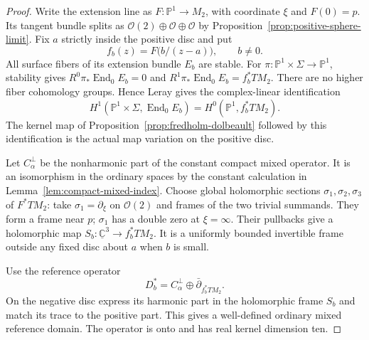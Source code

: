 \documentclass[11pt]{amsart}
\theoremstyle{definition}
\theoremstyle{remark}
\theoremstyle{plain}
\begin{document}
\begin{proof}
Write the extension line as $F:\mathbb P^1\to M_2$,
with coordinate $\xi$ and $F(0)=p$. Its tangent bundle
splits as $\mathcal O(2)\oplus\mathcal O\oplus\mathcal O$
by Proposition~\ref{prop:positive-sphere-limit}.
Fix $a$ strictly inside the positive disc and put
\[
                     f_b(z)=F\bigl(b/(z-a)\bigr),\qquad b\ne0.
\]
All surface fibers of its extension bundle $E_b$ are stable.
For $\pi:\mathbb P^1\times\Sigma\to\mathbb P^1$, stability
gives $R^0\pi_*\operatorname{End}_0E_b=0$ and
$R^1\pi_*\operatorname{End}_0E_b=f_b^*TM_2$.
There are no higher fiber cohomology groups. Hence Leray gives
the complex-linear identification
\begin{equation}\label{eq:fully-stable-leray-orientation}
 H^1(\mathbb P^1\times\Sigma,\operatorname{End}_0E_b)
                         =H^0(\mathbb P^1,f_b^*TM_2).
\end{equation}
The kernel map of Proposition~\ref{prop:fredholm-dolbeault}
followed by this identification is the actual map
variation on the positive disc.

Let $C_\alpha^\perp$ be the nonharmonic part of the
constant compact mixed operator. It is an isomorphism
in the ordinary spaces by the constant calculation in
Lemma~\ref{lem:compact-mixed-index}. Choose global
holomorphic sections $\sigma_1,\sigma_2,\sigma_3$ of
$F^*TM_2$: take $\sigma_1=\partial_\xi$ on $\mathcal O(2)$
and frames of the two trivial summands. They form a
frame near $p$; $\sigma_1$ has a double zero at $\xi=\infty$.
Their pullbacks give a holomorphic map
$S_b:\underline{\mathbb C}^3\to f_b^*TM_2$.
It is a uniformly bounded invertible frame outside any
fixed disc about $a$ when $b$ is small.

Use the reference operator
\[
             D_b^*=C_\alpha^\perp
                                  \oplus\bar\partial_{f_b^*TM_2}.
\]
On the negative disc express its harmonic part in the
holomorphic frame $S_b$ and match its trace to the
positive part. This gives a well-defined ordinary
mixed reference domain. The operator is onto and has
real kernel dimension ten.


\end{proof}
\end{document}
